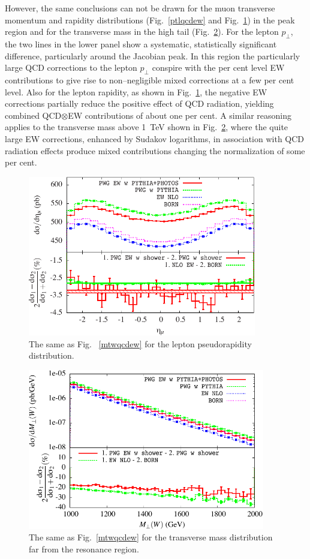 \documentclass[11pt,a4paper]{article}
\begin{document}
However, the same conclusions can not be drawn for the muon transverse momentum and rapidity distributions (Fig.~\ref{ptlqcdew} and Fig.~\ref{rapidityqcdew}) 
in the peak region and for the transverse mass in the high tail (Fig.~\ref{ewqcd-highmass}). For 
the lepton $p_\perp$, the two lines in the lower panel show a 
systematic, statistically significant difference, particularly around the Jacobian peak. In this region the particularly large QCD corrections 
to the lepton $p_\perp$ conspire with the per cent level EW 
contributions to give rise to non--negligible mixed corrections at a few per cent level. Also for the lepton rapidity, as shown in 
Fig.~\ref{rapidityqcdew}, the negative EW corrections partially reduce the positive effect of QCD radiation, yielding combined 
QCD$\otimes$EW contributions of about one per cent. A similar reasoning applies to the transverse mass above 1~TeV shown in Fig.~\ref{ewqcd-highmass}, where the quite large EW corrections, enhanced by Sudakov logarithms, in association with QCD radiation effects produce mixed contributions changing the normalization of some per cent.


\begin{figure}[hbtp]
\begin{center}
\includegraphics[height=7cm]{Fig5}
\caption{The same as Fig. ~\ref{mtwqcdew} for the lepton pseudorapidity distribution.}
\label{rapidityqcdew}
\end{center}
\end{figure}

\begin{figure}[hbtp]
\begin{center}
\includegraphics[height=7cm]{Fig6}
\caption{The same as Fig.~\ref{mtwqcdew} for the transverse mass distribution far from the resonance region.}
\label{ewqcd-highmass}
\end{center}
\end{figure}
\end{document}
